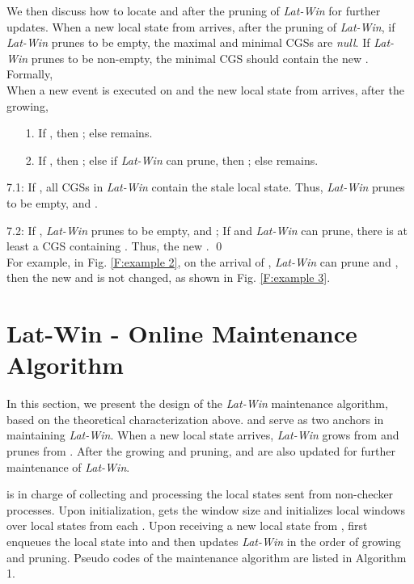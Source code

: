 \documentclass[12pt,journal,letterpaper,compsoc]{IEEEtran}
\begin{document}
We then discuss how to locate  and  after the pruning of {\it Lat-Win} for further updates. When a new local state from  arrives, after the pruning of {\it Lat-Win}, if {\it Lat-Win} prunes to be empty, the maximal and minimal CGSs are {\it null}. If {\it Lat-Win} prunes to be non-empty, the minimal CGS should contain the new . Formally, \\

 When a new event  is executed on  and the new local state  from  arrives, after the growing,
\begin{itemize}
    \item[1.] If , then ; else  remains.
    \item[2.] If , then ; else if {\it Lat-Win} can prune, then ; else  remains.
\end{itemize}


7.1: If , all CGSs in {\it Lat-Win} contain the stale local state. Thus, {\it Lat-Win} prunes to be empty, and .

7.2: If , {\it Lat-Win} prunes to be empty, and ; If  and {\it Lat-Win} can prune, there is at least a CGS containing . Thus, the new . \qed \\

For example, in Fig. \ref{F:example 2}, on the arrival of , {\it Lat-Win} can prune and , then the new  and  is not changed, as shown in Fig. \ref{F:example 3}.

\section{Lat-Win - Online Maintenance Algorithm}
\label{sec:algorithm}

In this section, we present the design of the {\it Lat-Win} maintenance algorithm, based on the theoretical characterization above.  and  serve as two anchors in maintaining {\it Lat-Win}. When a new local state arrives, {\it Lat-Win} grows from  and prunes from . After the growing and pruning,  and  are also updated for further maintenance of {\it Lat-Win}.

 is in charge of collecting and processing the local states sent from non-checker processes. Upon initialization,  gets the window size  and initializes  local windows  over local states from each . Upon receiving a new local state from ,  first enqueues the local state into  and then updates {\it Lat-Win} in the order of growing and pruning. Pseudo codes of the maintenance algorithm are listed in Algorithm 1.
\end{document}
